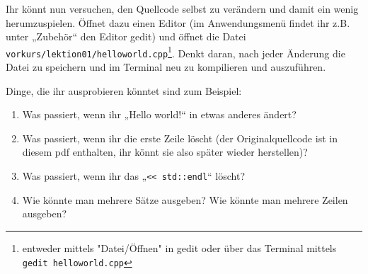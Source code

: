 Ihr könnt nun versuchen, den Quellcode selbst zu verändern und damit ein wenig
herumzuspielen. Öffnet dazu einen Editor (im Anwendungsmenü findet ihr z.B.
unter „Zubehör“ den Editor gedit) und öffnet die Datei
\texttt{vorkurs/lektion01/helloworld.cpp}\footnote{entweder mittels
"Datei/Öffnen" in gedit oder über das Terminal mittels \texttt{gedit
helloworld.cpp}}. Denkt daran, nach jeder Änderung die Datei zu speichern und
im Terminal neu zu kompilieren und auszuführen.

Dinge, die ihr ausprobieren könntet sind zum Beispiel:
\begin{enumerate}
    \item Was passiert, wenn ihr „Hello world!“ in etwas anderes ändert?
    \item Was passiert, wenn ihr die erste Zeile löscht (der Originalquellcode
        ist in diesem pdf enthalten, ihr könnt sie also später wieder
        herstellen)?
    \item Was passiert, wenn ihr das „\verb|<< std::endl|“ löscht?
    \item Wie könnte man mehrere Sätze ausgeben? Wie könnte man mehrere Zeilen
        ausgeben?
\end{enumerate}
